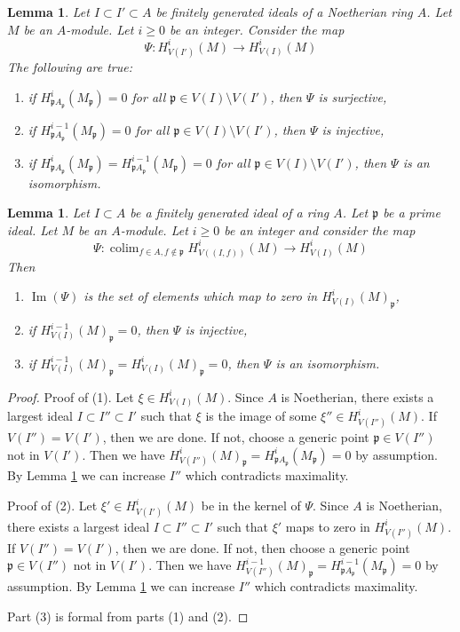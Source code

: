 \documentclass[10pt,a4paper]{amsart}
\theoremstyle{plain}
\newtheorem{lemma}[subsection]{Lemma}
\theoremstyle{definition}
\theoremstyle{remark}
\numberwithin{equation}{subsection}
\def\colim{\mathop{\mathrm{colim}}\nolimits}
\def\Im{\mathop{\mathrm{Im}}}
\begin{document}
\begin{lemma}
\label{lemma-isomorphism}
Let $I \subset I' \subset A$ be finitely generated ideals of a
Noetherian ring $A$. Let $M$ be an $A$-module. Let $i \geq 0$ be an integer.
Consider the map
$$
\Psi : H^i_{V(I')}(M) \to H^i_{V(I)}(M)
$$
The following are true:
\begin{enumerate}
\item if $H^i_{\mathfrak pA_\mathfrak p}(M_\mathfrak p) = 0$
for all $\mathfrak p \in V(I) \setminus V(I')$, then
$\Psi$ is surjective,
\item if $H^{i - 1}_{\mathfrak pA_\mathfrak p}(M_\mathfrak p) = 0$
for all $\mathfrak p \in V(I) \setminus V(I')$, then
$\Psi$ is injective,
\item if $H^i_{\mathfrak pA_\mathfrak p}(M_\mathfrak p) =
H^{i - 1}_{\mathfrak pA_\mathfrak p}(M_\mathfrak p) = 0$
for all $\mathfrak p \in V(I) \setminus V(I')$, then
$\Psi$ is an isomorphism.
\end{enumerate}
\end{lemma}

\begin{lemma}
\label{lemma-elements-come-from-bigger}
Let $I \subset A$ be a finitely generated ideal of a ring $A$.
Let $\mathfrak p$ be a prime ideal. Let $M$ be an $A$-module.
Let $i \geq 0$ be an integer and consider the map
$$
\Psi :
\colim_{f \in A, f \not \in \mathfrak p} H^i_{V((I, f))}(M)
\longrightarrow
H^i_{V(I)}(M)
$$
Then
\begin{enumerate}
\item $\Im(\Psi)$ is the set of elements which map to zero in
$H^i_{V(I)}(M)_\mathfrak p$,
\item if $H^{i - 1}_{V(I)}(M)_\mathfrak p = 0$, then $\Psi$ is injective,
\item if $H^{i - 1}_{V(I)}(M)_\mathfrak p = H^i_{V(I)}(M)_\mathfrak p = 0$,
then $\Psi$ is an isomorphism.
\end{enumerate}
\end{lemma}

\begin{proof}
Proof of (1).
Let $\xi \in H^i_{V(I)}(M)$. Since $A$ is Noetherian, there exists a
largest ideal $I \subset I'' \subset I'$ such that $\xi$ is the image
of some $\xi'' \in H^i_{V(I'')}(M)$. If $V(I'') = V(I')$, then we are
done. If not, choose a generic point $\mathfrak p \in V(I'')$ not in $V(I')$.
Then we have $H^i_{V(I'')}(M)_\mathfrak p =
H^i_{\mathfrak pA_\mathfrak p}(M_\mathfrak p) = 0$ by assumption.
By Lemma \ref{lemma-elements-come-from-bigger} we can increase $I''$
which contradicts maximality.

\medskip\noindent
Proof of (2). Let $\xi' \in H^i_{V(I')}(M)$ be in the kernel of $\Psi$.
Since $A$ is Noetherian, there exists a
largest ideal $I \subset I'' \subset I'$ such that $\xi'$
maps to zero in $H^i_{V(I'')}(M)$. If $V(I'') = V(I')$, then we are
done. If not, then choose a generic point $\mathfrak p  \in V(I'')$
not in $V(I')$. Then we have $H^{i - 1}_{V(I'')}(M)_\mathfrak p =
H^{i - 1}_{\mathfrak pA_\mathfrak p}(M_\mathfrak p) = 0$ by assumption.
By Lemma \ref{lemma-elements-come-from-bigger} we can increase $I''$
which contradicts maximality.

\medskip\noindent
Part (3) is formal from parts (1) and (2).
\end{proof}
\end{document}
